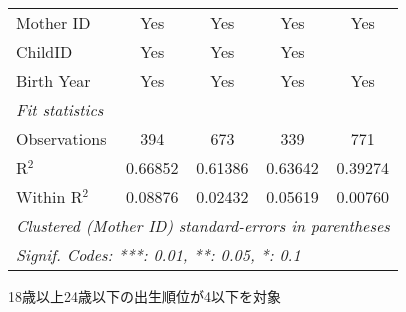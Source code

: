 \documentclass{article}
\begin{document}
\begin{threeparttable}[b]
\begin{tabular}{lcccc}
      Mother ID                                     & Yes            & Yes           & Yes          & Yes\\  
      ChildID                                       & Yes            & Yes           & Yes          & \\  
      Birth Year                                    & Yes            & Yes           & Yes          & Yes\\  
      \midrule
      \emph{Fit statistics}\\
      Observations                                  & 394            & 673           & 339          & 771\\  
      R$^2$                                         & 0.66852        & 0.61386       & 0.63642      & 0.39274\\  
      Within R$^2$                                  & 0.08876        & 0.02432       & 0.05619      & 0.00760\\  
      \midrule \midrule
      \multicolumn{5}{l}{\emph{Clustered (Mother ID) standard-errors in parentheses}}\\
      \multicolumn{5}{l}{\emph{Signif. Codes: ***: 0.01, **: 0.05, *: 0.1}}\\
   \end{tabular}
   
   \begin{tablenotes}\item 18歳以上24歳以下の出生順位が4以下を対象
   \end{tablenotes}
\end{threeparttable}
\par\endgroup
\end{document}
